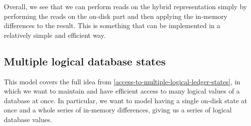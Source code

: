 \documentclass[11pt,a4paper]{article}
\newcommand\restrict[2]{\left.#1\right|_{#2}}
\newcommand\deltavar[1]{\accentset{\Delta}{#1}}
\begin{document}
\begin{center}
\end{center}

Overall, we see that we can perform reads on the hybrid representation simply
by performing the reads on the on-disk part and then applying the in-memory
differences to the result. This is something that can be implemented in a
relatively simple and efficient way.

\subsection{Multiple logical database states}
\label{multiple-logical-database-states}

This model covers the full idea from \cref{access-to-multiple-logical-ledger-states},
in which we want to maintain and have efficient access to many logical values of
a database at once. In particular, we want to model having a single on-disk state
at once and a whole series of in-memory differences, giving us a series of
logical database values.
\end{document}
